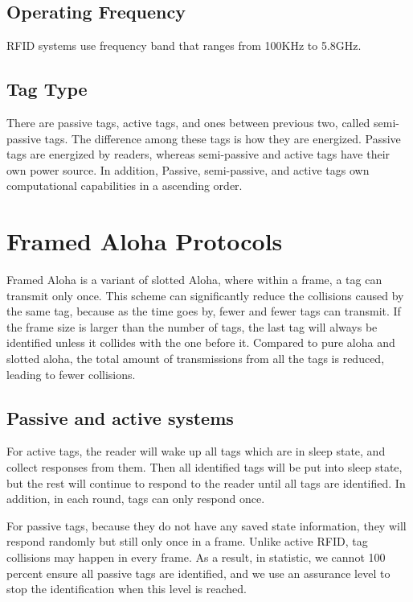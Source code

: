 \documentclass[12pt,letterpaper]{article}
\begin{document}
\subsection{Operating Frequency}
RFID systems use frequency band that ranges from 100KHz
to 5.8GHz\cite{survey}. 

\subsection{Tag Type}
There are passive tags, active tags, and ones between previous
two, called semi-passive tags. The difference among these tags
is how they are energized. Passive tags are energized by readers, 
whereas semi-passive and active tags have their own power source.
In addition, Passive, semi-passive, and active tags own computational
capabilities in a ascending order.

\section{Framed Aloha Protocols}
Framed Aloha is a variant of slotted Aloha, where within a frame, a tag
can transmit only once\cite{frame}. This scheme can significantly 
reduce the collisions caused by the same tag, because as the time 
goes by, fewer and fewer tags can transmit. If the frame size
is larger than the number of tags, the last tag will always be identified
unless it collides with the one before it. Compared to pure aloha and
slotted aloha, the total amount of transmissions from all the tags is
reduced, leading to fewer collisions.

\subsection{Passive and active systems}
For active tags, the reader will wake up all tags which are in sleep state, 
and collect responses from them. Then all identified tags will be put 
into sleep state, but the rest will continue to respond to the reader 
until all tags are identified. In addition, in each round, tags can only 
respond once. 

For passive tags, because they do not have any saved state information,
they will respond randomly but still only once in a frame. Unlike active
RFID, tag collisions may happen in every frame. As a result, in statistic,
we cannot 100 percent ensure all passive tags are identified, and we 
use an assurance level to stop the identification when this level is 
reached\cite{frame}.
\end{document}
